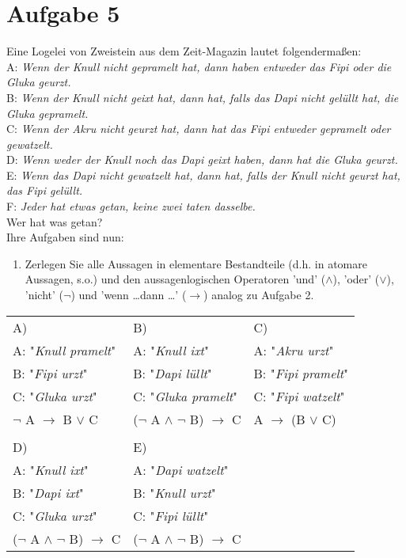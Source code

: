 \section*{Aufgabe 5}

Eine Logelei von Zweistein aus dem Zeit-Magazin lautet folgendermaßen:\\

A: \textit{Wenn der Knull nicht gepramelt hat, dann haben entweder das Fipi oder die Gluka geurzt.}\\

B: \textit{Wenn der Knull nicht geixt hat, dann hat, falls das Dapi nicht gelüllt hat, die Gluka gepramelt.}\\

C: \textit{Wenn der Akru nicht geurzt hat, dann hat das Fipi entweder gepramelt oder gewatzelt.}\\

D: \textit{Wenn weder der Knull noch das Dapi geixt haben, dann hat die Gluka geurzt.}\\

E: \textit{Wenn das Dapi nicht gewatzelt hat, dann hat, falls der Knull nicht geurzt hat, das Fipi gelüllt.}\\

F: \textit{Jeder hat etwas getan, keine zwei taten dasselbe.}\\

Wer hat was getan?\\

Ihre Aufgaben sind nun:

\begin{enumerate}[label={a)}, leftmargin=*]
    \item Zerlegen Sie alle Aussagen in elementare Bestandteile (d.h. in atomare Aussagen, s.o.) und den aussagenlogischen Operatoren 'und' ($\land$), 'oder' ($\lor$), 'nicht' ($\neg$) und 'wenn \dots dann \dots ' ($\rightarrow$) analog zu Aufgabe 2.
\end{enumerate}

\begin{tabularx}{\textwidth}{XXX}
A) & B) & C)\\
A: "\textit{Knull pramelt}" & A: "\textit{Knull ixt}" & A: "\textit{Akru urzt}"\\
B: "\textit{Fipi urzt}" & B: "\textit{Dapi lüllt}" & B: "\textit{Fipi pramelt}"\\
C: "\textit{Gluka urzt}" & C: "\textit{Gluka pramelt}" & C: "\textit{Fipi watzelt}"\\
$\neg$ A $\rightarrow$ B $\lor$ C & ($\neg$ A $\land$ $\neg$ B) $\rightarrow$ C & A $\rightarrow$ (B $\lor$ C)\\
& &\\
D) & E) &\\
A: "\textit{Knull ixt}" & A: "\textit{Dapi watzelt}" &\\
B: "\textit{Dapi ixt}" & B: "\textit{Knull urzt}" &\\
C: "\textit{Gluka urzt}" & C: "\textit{Fipi lüllt}"& \\
($\neg$ A $\land$ $\neg$ B) $\rightarrow$ C & ($\neg$ A $\land$ $\neg$ B) $\rightarrow$ C &
\end{tabularx}

